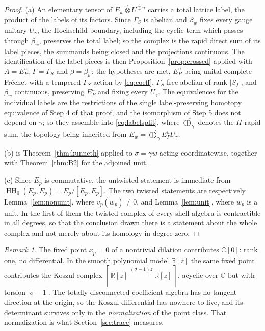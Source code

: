 \documentclass[11pt]{amsart}
\theoremstyle{definition}
\theoremstyle{remark}
\newtheorem{remark}[theorem]{Remark}
\newcommand{\C}{\mathbb C}
\newcommand{\R}{\mathbb R}
\newcommand{\HH}{\operatorname{HH}}
\begin{document}
\begin{proof}
(a)  An elementary tensor of
$E_w\widehat\otimes U^{\widehat\otimes n}$ carries
a total lattice label, the product of the labels of its factors.  Since
$\Gamma_S$ is abelian and $\beta_w$ fixes every gauge unitary $U_{\gamma}$, the
Hochschild boundary, including the cyclic term which passes through
$\beta_w$, preserves the total label; so the complex is the rapid direct sum of
its label pieces, the summands being closed and the projections continuous.
The identification of the label pieces is then
Proposition~\ref{prop:crossed} applied with $A=E_P^{u}$, $\Gamma=\Gamma_S$ and
$\beta=\beta_w$: the hypotheses are met, $E_P^{u}$ being unital complete
Fr\'echet with a tempered $\Gamma_S$-action by \eqref{eq:coeff}, $\Gamma_S$
free abelian of rank $|S_f|$, and $\beta_w$ continuous, preserving $E_P^{u}$
and fixing every $U_{\gamma}$.  The equivalences for the individual labels are
the restrictions of the single label-preserving homotopy equivalence of Step 4
of that proof, and the isomorphism of Step 5 does not depend on $\gamma$; so
they assemble into \eqref{eq:labelsplit}, where $\widehat\bigoplus_{\gamma}$
denotes the $H$-rapid sum, the topology being inherited from
$E_w=\widehat\bigoplus_{\gamma}E_P^{u}U_{\gamma}$.

(b) is Theorem~\ref{thm:kunneth} applied to $\sigma=\gamma w$ acting
coordinatewise, together with Theorem~\ref{thm:B2} for the adjoined unit.

(c)  Since $E_p$ is commutative, the untwisted statement is immediate from
$\HH_0(E_p,E_p)=E_p/[E_p,E_p]$.  The two twisted statements are respectively
Lemma~\ref{lem:nonunit}, where $v_p(w_p)\ne0$, and Lemma~\ref{lem:unit}, where
$w_p$ is a unit.  In the first of them the twisted complex of every shell
algebra is contractible in all degrees, so that the conclusion drawn there is a
statement about the whole complex and not merely about its homology in degree
zero.
\end{proof}

\begin{remark}\label{rem:notorsion}
The fixed point $x_p=0$ of a nontrivial dilation contributes $\C[0]$: rank one,
no differential.  In the smooth polynomial model $\R[z]$ the same fixed point
contributes the Koszul complex
$[\,\R[z]\xrightarrow{(\sigma-1)z}\R[z]\,]$, acyclic over $\C$ but with torsion
$|\sigma-1|$.  The totally disconnected coefficient algebra has no tangent
direction at the origin, so the Koszul differential has nowhere to live, and
its determinant survives only in the \emph{normalization} of the point class.
That normalization is what Section~\ref{sec:trace} measures.
\end{remark}
\end{document}
